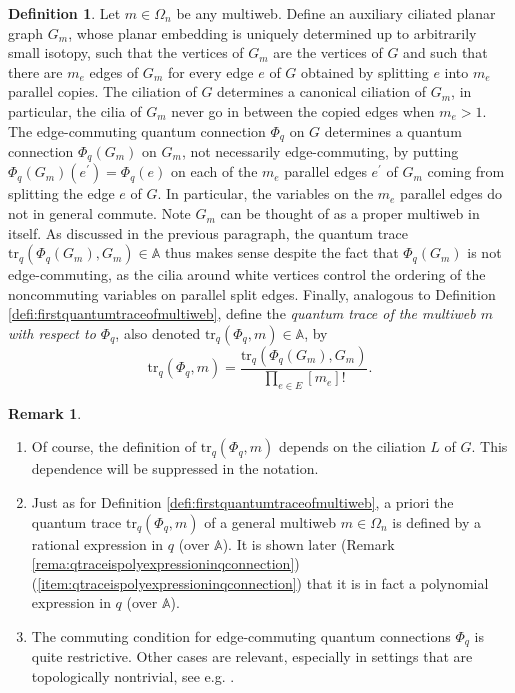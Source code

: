 \documentclass[12pt, reqno]{amsart}
\theoremstyle{definition}
\newtheorem{defi}[theo]{Definition}
\newtheorem{rema}[theo]{Remark}
\newcommand{\trqc}{\mathrm{tr}_q}%
\begin{document}
\begin{defi}
Let $m\in\Omega_n$ be any multiweb.  Define an auxiliary ciliated planar graph $G_m$, whose planar embedding is uniquely determined up to arbitrarily small isotopy, such that the vertices of $G_m$ are the vertices of $G$ and such that there are $m_e$ edges of $G_m$ for every edge $e$ of $G$ obtained by splitting $e$ into $m_e$ parallel copies.  The ciliation of $G$ determines a canonical ciliation of $G_m$, in particular, the cilia of $G_m$ never go in between the copied edges when $m_e>1$.  The edge-commuting quantum connection $\Phi_q$ on $G$ determines a quantum connection $\Phi_q(G_m)$ on $G_m$, not necessarily edge-commuting, by putting $\Phi_q(G_m)(e^\prime)=\Phi_q(e)$ on each of the $m_e$ parallel edges $e^\prime$ of $G_m$ coming from splitting the edge $e$ of $G$.  In particular, the variables on the $m_e$ parallel edges do not in general commute.  Note $G_m$ can be thought of as a proper multiweb in itself.  As discussed in the previous paragraph, the quantum trace $\trqc(\Phi_q(G_m),G_m)\in\mathbb{A}$ thus makes sense despite the fact that $\Phi_q(G_m)$ is not edge-commuting, as the cilia around white vertices control the ordering of the noncommuting variables on parallel split edges.  Finally, analogous to Definition \ref{defi:firstquantumtraceofmultiweb}, define the \emph{quantum trace of the multiweb $m$ with respect to $\Phi_q$}, also denoted $\trqc(\Phi_q,m)\in\mathbb{A}$, by
$$
\trqc(\Phi_q,m)=\frac{\trqc(\Phi_q(G_m),G_m)}{\prod_{e\in E}[m_e]!}.
$$
\end{defi}

\begin{rema}\label{rema:definitionofquantumtraceofmultiwebs}
\begin{enumerate}
\item\label{item2:rema:definitionofquantumtraceofmultiwebs}
Of course, the definition of $\trqc(\Phi_q,m)$ depends on the ciliation $L$ of $G$.  This dependence will be suppressed in the notation.  
\item\label{item:rema:definitionofquantumtraceofmultiwebs}
Just as for Definition \ref{defi:firstquantumtraceofmultiweb}, a priori the quantum trace $\trqc(\Phi_q,m)$ of a general multiweb $m\in\Omega_n$ is defined by a rational expression in $q$ (over $\mathbb{A}$).  It is shown later  (Remark \ref{rema:qtraceispolyexpressioninqconnection}) 
(\ref{item:qtraceispolyexpressioninqconnection}) 
that it is in fact a polynomial expression in $q$ (over $\mathbb{A}$).
\item  
The commuting condition for edge-commuting quantum connections $\Phi_q$ is quite restrictive.  Other cases are relevant, especially in settings that are topologically nontrivial, see e.g. \cite{bc21, ChekhovShapiro, douglas1, GoncharovKenyon, pp24}.
\end{enumerate}
\end{rema}
\end{document}
